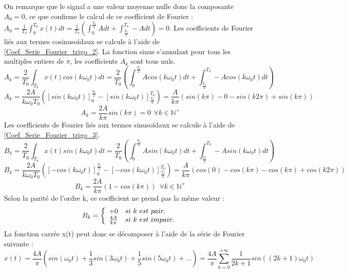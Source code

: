 	On remarque que le signal a une valeur moyenne nulle donc la composante $A_{0}=0$, ce que confirme le calcul de ce coefficient de Fourier : $A_{0}=\frac{1}{T_{0}}\int_{0}^{T_{0}}x(t)dt=\frac{1}{T_{0}}(\int_{0}^{\frac{T_{0}}{2}}Adt+\int_{\frac{T_{0}}{2}}^{T_{0}}-Adt)=0$. Les coefficients de Fourier liés aux termes cosinusoïdaux se calcule à l'aide de \ref{Coef_Serie_Fourier_trigo_2}. La fonction sinus s'annulant pour tous les multiples entiers de $\pi$, les coefficients $A_{k}$ sont tous nuls.
	\begin{equation*}
	A_{k}=\frac{2}{T_{0}}\int_{T_{0}}x(t)cos(k\omega_{0}t)dt=\frac{2}{T_{0}}(\int_{0}^{\frac{T_{0}}{2}}Acos(k\omega_{0}t)dt+\int_{\frac{T_{0}}{2}}^{T_{0}}-Acos(k\omega_{0}t)dt)
	\end{equation*}
	\begin{equation*}
	A_{k}=\frac{2A}{k\omega_{0}T_{0}}([sin(k\omega_{0}t)]_{0}^{\frac{T_{0}}{2}}-[sin(k\omega_{0}t)]_{\frac{T_{0}}{2}}^{T_{0}})=\frac{A}{k\pi}(sin(k\pi)-0-sin(k2\pi)+sin(k\pi))
	\end{equation*}
	\begin{equation*}
	A_{k}=\frac{2A}{k\pi}sin(k\pi)=0~~\forall k \in \mathbb{N^{+}}
	\end{equation*}
	Les coefficients de Fourier liés aux termes sinusoïdaux se calcule à l'aide de \ref{Coef_Serie_Fourier_trigo_3}.
	\begin{equation*}
	B_{k}=\frac{2}{T_{0}}\int_{T_{0}}x(t)sin(k\omega_{0}t)dt=\frac{2}{T_{0}}(\int_{0}^{\frac{T_{0}}{2}}Asin(k\omega_{0}t)dt+\int_{\frac{T_{0}}{2}}^{T_{0}}-Asin(k\omega_{0}t)dt)
	\end{equation*}
	\begin{equation*}
	B_{k}=\frac{2A}{k\omega_{0}T_{0}}([-cos(k\omega_{0}t)]_{0}^{\frac{T_{0}}{2}}-[-cos(k\omega_{0}t)]_{\frac{T_{0}}{2}}^{T_{0}})=\frac{A}{k\pi}(cos(0)-cos(k\pi)-cos(k\pi)+cos(k2\pi))
	\end{equation*}
	\begin{equation*}
	B_{k}=\frac{2A}{k\pi}(1-cos(k\pi))~~\forall k \in \mathbb{N^{+}}
	\end{equation*}
	Selon la parité de l'ordre k, ce coefficient ne prend pas la même valeur :
	\begin{equation*}
	B_{k}=\left \{
	\begin{array}{l l}
	+0   & si~k~est~pair. \\
	\frac{4A}{k\pi}   & si~k~est~impair. \\
	\end{array}
	\right .
	\end{equation*}
	La fonction carrée x(t) peut donc se décomposer à l'aide de la série de Fourier suivante :
	\begin{equation*}
	x(t)=\frac{4A}{\pi}(sin(\omega_{0}t)+\frac{1}{3}sin(3\omega_{0}t)+\frac{1}{5}sin(5\omega_{0}t)+...)=\frac{4A}{\pi}\sum_{k=0}^{+\infty}\frac{1}{2k+1}sin((2k+1)\omega_{0}t)
	\end{equation*}
	
